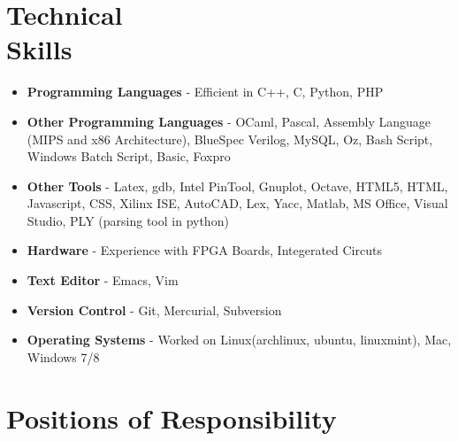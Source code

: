 \documentclass[margin,line]{resume}
\begin{document}
\begin{resume}
  \section{\mysidestyle Technical \\Skills}

  \begin{itemize}
  \item \textbf{\textsf{Programming Languages}} - Efficient in C++, C, Python, PHP
  \item \textbf{\textsf{Other Programming Languages}} - OCaml, Pascal, Assembly Language (MIPS and x86 Architecture), BlueSpec Verilog, MySQL, Oz, Bash Script, Windows Batch Script, Basic, Foxpro
  \item \textbf{\textsf{Other Tools}} - Latex, gdb, Intel PinTool, Gnuplot, Octave, HTML5, HTML, Javascript, CSS, Xilinx ISE, AutoCAD, Lex, Yacc, Matlab, MS Office, Visual Studio, PLY (parsing tool in python)
  \item \textbf{\textsf{Hardware}} - Experience with FPGA Boards, Integerated Circuts
  \item \textbf{\textsf{Text Editor}} - Emacs, Vim
  \item \textbf{\textsf{Version Control}} - Git, Mercurial, Subversion
  \item \textbf{\textsf{Operating Systems}} - Worked on Linux(archlinux, ubuntu, linuxmint), Mac, Windows 7/8
  \end{itemize}

  \section{\mysidestyle Positions of Responsibility}

  \begin{itemize}


\end{itemize}
\end{resume}
\end{document}

